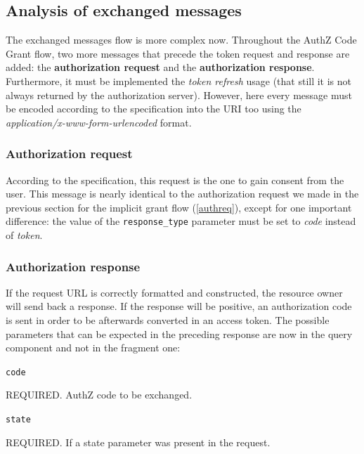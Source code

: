 \vspace{1cm}

\subsection{Analysis of exchanged messages}
The exchanged messages flow is more complex now. Throughout the AuthZ Code Grant flow, two more messages that precede the token request and response are added: the \textbf{authorization request} and the \textbf{authorization response}. Furthermore, it must be implemented the \textit{token refresh} usage (that still it is not always returned by the authorization server). However, here every message must be encoded according to the specification into the URI too using the \textit{application/x-www-form-urlencoded} format.

\subsubsection{Authorization request}

According to the specification, this request is the one to gain consent from the user. This message is nearly identical to the authorization request we made in the previous section for the implicit grant flow (\ref{authreq}), except for one important difference: the value of the \texttt{response\_type} parameter must be set to \textit{code} instead of \textit{token}.

\subsubsection{Authorization response}
If the request URL is correctly formatted and constructed, the resource owner will send back a response. If the response will be positive, an authorization code is sent in order to be afterwards converted in an access token.
The possible parameters that can be expected in the preceding response are now in the query component and not in the fragment one:

\texttt{code}

\hspace{0.5cm}REQUIRED. AuthZ code to be exchanged.

\texttt{state}

\hspace{0.5cm}REQUIRED. If a state parameter was present in the request.

\vspace{0.5cm}

